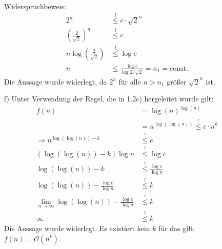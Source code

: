 \documentclass{article}
\begin{document}
\begin{enumerate}
\begin{align*}
        \end{align*}
        Widerspruchbeweis:
        \begin{align*}
            2^n &\stackrel{!}{\le} c\cdot {\sqrt 2}^n\\
            \left(\frac{2}{\sqrt{2}}\right)^n &\stackrel{!}{\le} c\\
            n \log\left(\frac{2}{\sqrt{2}}\right) &\stackrel{!}{\le} \log c\\
            n &\le \frac{\log c}{\log 2/\sqrt{2}} = n_1 = \mathrm{const.}
        \end{align*}
        Die Aussage wurde widerlegt, da $2^n$ für alle $n>n_1$ größer $\sqrt{2}^n$ ist. 
        \item[f)]
        Unter Verwendung der Regel, die in 1.2c) hergeleitet wurde gilt:  
        \begin{align*}
            f(n) &= \log(n)^{\log(n)}\\
            &= n^{\log(\log(n))} \stackrel{!}{\le} c \cdot n^k\\
            \Rightarrow n^{\log(\log(n))-k} &\stackrel{!}{\le} c\\
            \left(\log(\log(n))-k\right) \log n &\stackrel{!}{\le} \log c\\
            \log(\log(n))-k &\stackrel{!}{\le} \frac{\log c}{\log n} \\
            \log(\log(n))-\frac{\log c}{\log n} &\stackrel{!}{\le} k \\
            \lim_{n\rightarrow \infty} \log(\log(n))-\frac{\log c}{\log n} &\stackrel{!}{\le} k \\
            \infty &\stackrel{!}{\le} k
        \end{align*} 
        Die Aussage wurde widerlegt. Es existiert kein $k$ für das gilt: $f(n) = \mathcal{O}\left(n^k\right)$.
    \end{enumerate}
\end{document}
